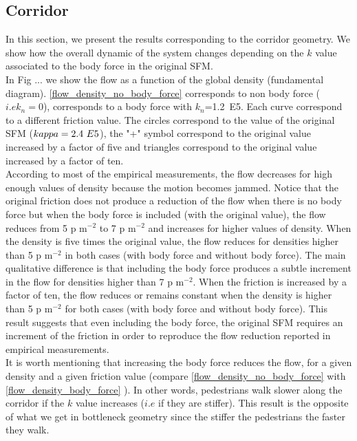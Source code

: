 \documentclass[preprint,12pt]{elsarticle}
\begin{document}
\subsection{\label{corridor} Corridor}

In this section, we present the results corresponding to the corridor geometry. We show how the overall dynamic of the system changes depending on the $k$ value associated to the body force in the original SFM.\\

In Fig ... we show the flow as a function of the global density (fundamental diagram). \ref{flow_density_no_body_force} corresponds to non body force ($i.e k_n=0$), \label{flow_density_body_force} corresponds to a body force with $k_n$=1.2~E5. Each curve correspond to a different friction value. The circles correspond to the value of the original SFM ($\\kappa = 2.4~E5$), the "+" symbol correspond to the original value increased by a factor of five and triangles correspond to the original value increased by a factor of ten. \\

According to most of the empirical measurements, the flow decreases for high enough values of density because the motion becomes jammed. Notice that the original friction does not produce a reduction of the flow when there is no body force but when the body force is included (with the original value), the flow reduces from  5 p m$^{-2}$ to 7 p m$^{-2}$ and increases for higher values of density. When the density is five times the original value, the flow reduces for densities higher than 5 p m$^{-2}$ in both cases (with body force and without body force). The main qualitative difference is that including the body force produces a subtle increment in the flow for densities higher than 7 p m$^{-2}$. When the friction is increased by a factor of ten, the flow reduces or remains constant when the density is higher than 5 p m$^{-2}$ for both cases (with body force and without body force). This result suggests that even including the body force, the original SFM requires an increment of the friction in order to reproduce the flow reduction reported in empirical measurements.\\

It is worth mentioning that increasing the body force reduces the flow, for a given density and a given friction value (compare \ref{flow_density_no_body_force} with \ref{flow_density_body_force} ). In other words, pedestrians walk slower along the corridor if the $k$ value increases ($i.e$ if they are stiffer). This result is the opposite of what we get in bottleneck geometry since the stiffer the pedestrians the faster they walk.\\
\end{document}

